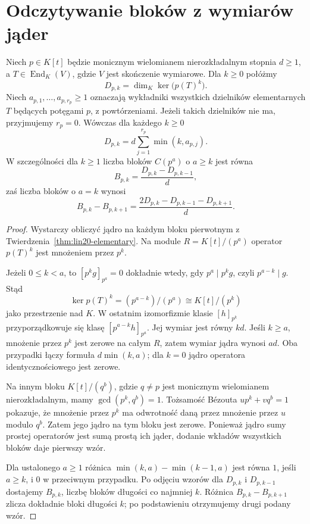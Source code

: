 \section{Odczytywanie bloków z wymiarów jąder}
\label{sec:lin20-kernels}

\begin{twierdzenie}
\label{thm:lin20-kernel-count}
Niech \(p\in K[t]\) będzie monicznym
wielomianem nierozkładalnym stopnia
\(d\ge1\), a \(T\in\operatorname{End}_K(V)\),
gdzie \(V\) jest skończenie wymiarowe.
Dla \(k\ge0\) połóżmy
\[
 D_{p,k}=\dim_K\ker\bigl(p(T)^k\bigr).
\]
Niech \(a_{p,1},\ldots,a_{p,r_p}\ge1\)
oznaczają wykładniki wszystkich
dzielników elementarnych \(T\)
będących potęgami \(p\), z powtórzeniami.
Jeżeli takich dzielników nie ma,
przyjmujemy \(r_p=0\).
Wówczas dla każdego \(k\ge0\)
\[
 D_{p,k}
 =d\sum_{j=1}^{r_p}\min(k,a_{p,j}).
\]
W szczególności dla \(k\ge1\)
liczba bloków \(C(p^a)\) o \(a\ge k\)
jest równa
\[
 B_{p,k}=\frac{D_{p,k}-D_{p,k-1}}{d},
\]
zaś liczba bloków o \(a=k\) wynosi
\[
 B_{p,k}-B_{p,k+1}
 =\frac{2D_{p,k}-D_{p,k-1}-D_{p,k+1}}{d}.
\]
\end{twierdzenie}
\begin{proof}
Wystarczy obliczyć jądro na każdym
bloku pierwotnym z
Twierdzenia~\ref{thm:lin20-elementary}.
Na module \(R=K[t]/(p^a)\)
operator \(p(T)^k\)
jest mnożeniem przez \(p^k\).

Jeżeli \(0\le k<a\), to
\([p^kg]_{p^a}=0\) dokładnie wtedy,
gdy \(p^a\mid p^kg\), czyli
\(p^{a-k}\mid g\).
Stąd
\[
 \ker p(T)^k
 = (p^{a-k})/(p^a)
 \cong K[t]/(p^k)
\]
jako przestrzenie nad \(K\).
W ostatnim izomorfizmie
klasie \([h]_{p^k}\) przyporządkowuje się
klasę \([p^{a-k}h]_{p^a}\).
Jej wymiar jest równy \(kd\).
Jeśli \(k\ge a\), mnożenie przez \(p^k\)
jest zerowe na całym \(R\),
zatem wymiar jądra wynosi \(ad\).
Oba przypadki łączy formuła
\(d\min(k,a)\); dla \(k=0\)
jądro operatora identycznościowego
jest zerowe.

Na innym bloku
\(K[t]/(q^b)\), gdzie \(q\ne p\)
jest monicznym wielomianem
nierozkładalnym, mamy
\(\gcd(p^k,q^b)=1\).
Tożsamość Bézouta
\(up^k+vq^b=1\)
pokazuje, że mnożenie przez \(p^k\)
ma odwrotność daną przez mnożenie
przez \(u\) modulo \(q^b\).
Zatem jego jądro na tym bloku
jest zerowe.
Ponieważ jądro sumy prostej operatorów
jest sumą prostą ich jąder,
dodanie wkładów wszystkich bloków
daje pierwszy wzór.

Dla ustalonego \(a\ge1\)
różnica \(\min(k,a)-\min(k-1,a)\)
jest równa \(1\), jeśli \(a\ge k\),
i \(0\) w przeciwnym przypadku.
Po odjęciu wzorów dla \(D_{p,k}\)
i \(D_{p,k-1}\) dostajemy
\(B_{p,k}\), liczbę bloków długości
co najmniej \(k\).
Różnica \(B_{p,k}-B_{p,k+1}\)
zlicza dokładnie bloki długości \(k\);
po podstawieniu otrzymujemy
drugi podany wzór.
\end{proof}

